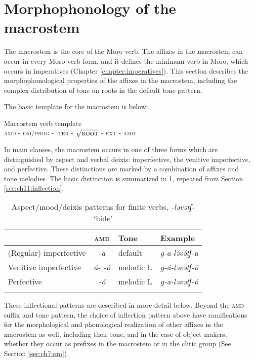 \section{Morphophonology of the macrostem}\label{sec:ch11:macrostem}

The macrostem is the core of the Moro verb. The affixes in the macrostem can occur in every Moro verb form, and it defines the minimum verb in Moro, which occurs in imperatives (Chapter \ref{chapter:imperatives}). This section describes the morphophonological properties of the affixes in the macrostem, including the complex distribution of tone on roots in the default tone pattern.  

The basic template for the macrostem is below:

\ea  Macrostem verb template\\ 
\textsc{amd} - \textsc{om/prog} - \textsc{iter} - $\sqrt{\textsc{root}}$ - \textsc{ext} - \textsc{amd}\\
\z 

In main clauses, the macrostem occurs in one of three forms which are distinguished by aspect and verbal deixis: imperfective, the venitive imperfective, and perfective. These distinctions are marked by a combination of affixes and tone melodies. The basic distinction is summarized in \ref{tab:ch11:4}, repeated from Section \ref{sec:ch11:inflection}.

\begin{table}
\begin{tabular}[t]{lcll}
\lsptoprule
						&  \textsc{amd}  		& Tone 			& Example \\
\midrule
(Regular) imperfective 	& \textit{-a} 	& default		& \textit{g-a-lə́və́tʃ-a} \\
Venitive imperfective 	& \textit{á- -ó} & melodic L 	& \textit{g-á-ləvətʃ-ó} \\	
Perfective 				& \textit{-ó} 	& melodic L 	& \textit{g-a-ləvətʃ-ó}  \\
\lspbottomrule
\end{tabular}	
\caption{Aspect/mood/deixis patterns for finite verbs, \textit{-ləvətʃ-} `hide'}
\label{tab:ch11:4}
\end{table}

These inflectional patterns are described in more detail below. Beyond the \textsc{amd} suffix and tone pattern, the choice of inflection pattern above have ramifications for the morphological and phonological realization of other affixes in the macrostem as well, including their tone, and in the case of object makers, whether they occur as prefixes in the macrostem or in the clitic group (See Section \ref{sec:ch7:om}).

